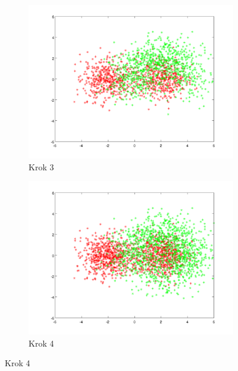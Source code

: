 \documentclass[10pt,a4paper]{article}
\begin{document}
\begin{figure}[H]
   \begin{subfigure}[b]{0.4\textwidth}
    \includegraphics[width=\textwidth]{dataGen2_step2.png}
    \caption{Krok 3}
  \end{subfigure}
  \hfill
  \begin{subfigure}[b]{0.4\textwidth}
    \includegraphics[width=\textwidth]{dataGen2_step3.png}
    \caption{Krok 4}
  \end{subfigure}
  

\end{figure}
\end{document}
